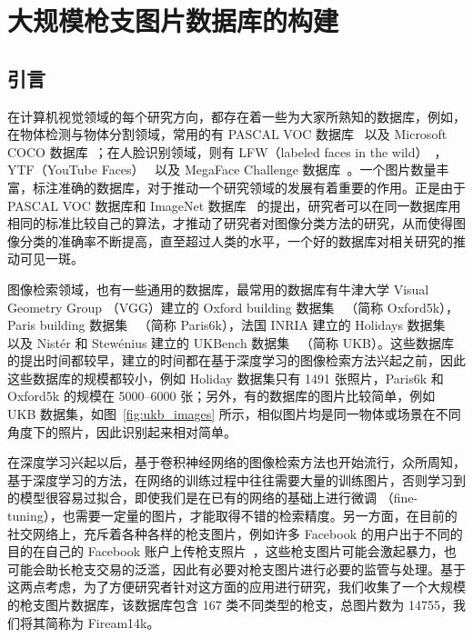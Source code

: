 
\chapter{大规模枪支图片数据库的构建}\label{chapter:firearm_dataset}
\section{引言}
在计算机视觉领域的每个研究方向，都存在着一些为大家所熟知的数据库，例如，在物体检测与物体分割领域，常用的有 PASCAL VOC 数据库~\cite{Everingham2014ThePV} 以及 Microsoft COCO 数据库~\cite{Lin2014MicrosoftCC}；在人脸识别领域，则有 LFW（labeled faces in the wild）~\cite{LFWTech}，YTF（YouTube Faces）~\cite{Wolf2011FaceRI} 以及 MegaFace Challenge 数据库~\cite{kemelmacher2016megaface}。一个图片数量丰富，标注准确的数据库，对于推动一个研究领域的发展有着重要的作用。正是由于 PASCAL VOC 数据库和 ImageNet 数据库~\cite{Russakovsky2015ImageNetLS} 的提出，研究者可以在同一数据库用相同的标准比较自己的算法，才推动了研究者对图像分类方法的研究，从而使得图像分类的准确率不断提高，直至超过人类的水平，一个好的数据库对相关研究的推动可见一斑。

图像检索领域，也有一些通用的数据库，最常用的数据库有牛津大学 Visual Geometry Group （VGG）建立的 Oxford building 数据集~\cite{Philbin2007ObjectRW} （简称 Oxford5k），Paris building 数据集~\cite{Philbin2008LostIQ} （简称 Paris6k），法国 INRIA 建立的 Holidays 数据集~\cite{Jgou2008HammingEA} 以及 Nist{\'e}r 和 Stew{\'e}nius 建立的 UKBench 数据集~\cite{Nistr2006ScalableRW} （简称 UKB）。这些数据库的提出时间都较早，建立的时间都在基于深度学习的图像检索方法兴起之前，因此这些数据库的规模都较小，例如 Holiday 数据集只有 1491 张照片，Paris6k 和 Oxford5k 的规模在 5000--6000 张；另外，有的数据库的图片比较简单，例如 UKB 数据集，如图~\ref{fig:ukb_images} 所示，相似图片均是同一物体或场景在不同角度下的照片，因此识别起来相对简单。

在深度学习兴起以后，基于卷积神经网络的图像检索方法也开始流行，众所周知，基于深度学习的方法，在网络的训练过程中往往需要大量的训练图片，否则学习到的模型很容易过拟合，即使我们是在已有的网络的基础上进行微调 （fine-tuning），也需要一定量的图片，才能取得不错的检索精度。另一方面，在目前的社交网络上，充斥着各种各样的枪支图片，例如许多 Facebook 的用户出于不同的目的在自己的 Facebook 账户上传枪支照片~\cite{Drange2016}，这些枪支图片可能会激起暴力，也可能会助长枪支交易的泛滥，因此有必要对枪支图片进行必要的监管与处理。基于这两点考虑，为了方便研究者针对这方面的应用进行研究，我们收集了一个大规模的枪支图片数据库，该数据库包含 167 类不同类型的枪支，总图片数为 14755，我们将其简称为 Fiream14k。


